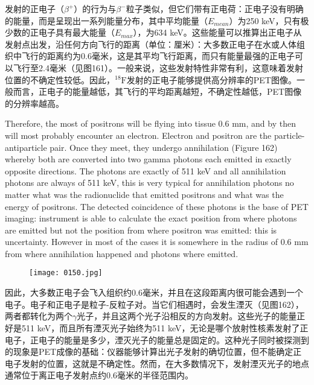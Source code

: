 \documentclass[dvipsnames, svgnames,a4paper,11pt]{article}
\begin{document}
发射的正电子（$\beta^{+}$）的行为与$\beta^{-}$粒子类似，但它们带有正电荷：正电子没有明确的能量，而是呈现出一系列能量分布，其中平均能量（$E_{mean}$）为250 keV，只有极少数的正电子具有最大能量（$E_{max}$），为634 keV。这些能量可以推算出正电子从发射点出发，沿任何方向飞行的距离（单位：厘米）：大多数正电子在水或人体组织中飞行的距离约为0.6毫米，这是其平均飞行距离，而只有能量最强的正电子可以飞行至2.4毫米（见图161）。一般来说，这些发射特性非常有利，这意味着发射位置的不确定性较低。因此，${}^\mathrm{18}\mathrm{F}$发射的正电子能够提供高分辨率的PET图像。一般而言，正电子的能量越低，其飞行的平均距离越短，不确定性越低，PET图像的分辨率越高。

Therefore, the most of positrons will be flying into tissue 0.6 mm, and by then will
most probably encounter an electron. Electron and positron are the particle-
antiparticle pair. Once they meet, they undergo annihilation (Figure 162) whereby
both are converted into two gamma photons each emitted in exactly opposite
directions. The photons are exactly of 511 keV and all annihilation photons are
always of 511 keV, this is very typical for annihilation photons no matter what was
the radionuclide that emitted positrons and what was the energy of positrons. The
detected coincidence of these photons is the base of PET imaging: instrument is
able to calculate the exact position from where photons are emitted but not the
position from where positron was emitted: this is uncertainty. However in most of the
cases it is somewhere in the radius of 0.6 mm from where annihilation happened and
photons where emitted.

\begin{figure}[h]
	\centering
    \texttt{[image: 0150.jpg]}    
     \label{fig161}
\end{figure}

因此，大多数正电子会飞入组织约0.6毫米，并且在这段距离内很可能会遇到一个电子。电子和正电子是粒子-反粒子对。当它们相遇时，会发生湮灭（见图162），两者都转化为两个$\gamma$光子，并且这两个光子沿相反的方向发射。这些光子的能量正好是511 keV，而且所有湮灭光子始终为511 keV，无论是哪个放射性核素发射了正电子，正电子的能量是多少，湮灭光子的能量总是固定的。这种光子同时被探测到的现象是PET成像的基础：仪器能够计算出光子发射的确切位置，但不能确定正电子发射的位置，这就是不确定性。然而，在大多数情况下，发射湮灭光子的地点通常位于离正电子发射点约0.6毫米的半径范围内。
\end{document}
